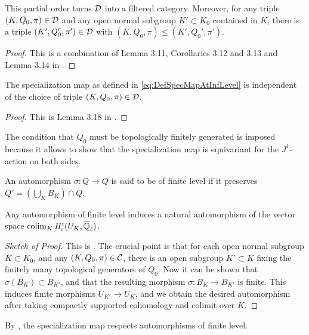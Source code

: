 \documentclass[../main.tex]{subfiles}
\begin{document}
\begin{lem}\label{lem:MiedaCategoryOfChoicesIsFiltered}
  This partial order turns $\mathcal{D}$ into a filtered category. Moreover, for any
  triple $(K, Q_0, \pi) \in \mathcal{D}$ and any open normal subgroup $K' \subset K_0$ 
  contained in $K$, there is a triple $(K', Q_0', \pi') \in \mathcal{D}$ with $(K, Q_0,
  \pi) \leq (K', Q_0', \pi')$. 
\begin{proof}
  This is a combination of Lemma 3.11, Corollaries 3.12 and 3.13 and 
  Lemma 3.14 in \cite{mieda2016geometric}.
\end{proof}
\end{lem}

\begin{prop}\label{lem:specmapisindependentofchoice}
  The specialization map as defined in \eqref{eq:DefSpecMapAtInfLevel} is
  independent of the choice of triple $(K, Q_0, \pi) \in \mathcal{D}$. 
  \begin{proof}
    This is Lemma 3.18 in \cite{mieda2016geometric}.
  \end{proof}
\end{prop}

The condition that $Q_0$ must be topologically finitely generated is imposed 
because it allows to show that the specialization map is equivariant for the 
$J^1$-action on both sides. 

\begin{defi}\label{def:MorphismOfFinLevel}
  An automorphism $\sigma\colon Q \to Q$ is said to be of finite level if it 
  preserves $Q' = (\bigcup_K B_K)\cap Q$. 
\end{defi}

\begin{lem}\label{lem:FinLevelAutoYIeldAutOfColim}
  Any automorphism of finite level
  induces a natural automorphism of the vector space $\operatorname*{colim}_K \mathit H_{\mathrm{c}}^i(U_K, {\overline {\mathbb{Q}}_\ell})$.
  \begin{proof}[Sketch of Proof] 
    This is \cite[Lemma 3.20]{mieda2016geometric}.  The crucial point 
    is that for each open normal subgroup $K \subset K_0$, and any 
    $(K, Q_0, \pi) \in \mathcal{C}$, there is an open subgroup $K' \subset K$ fixing the 
    finitely many topological generators of $Q_0$. Now it can be shown that 
    $\sigma(B_K) \subset B_{K'}$, and that the resulting morphism
    $\sigma\colon B_K \to B_{K'}$ is finite. This induces finite morphisms
    $U_{K'} \to U_K$, and we obtain the desired automorphism after taking 
    compactly supported cohomology and colimit over $K$. 
\end{proof}
\end{lem}
By \cite[Proposition 3.21]{mieda2016geometric}, the specialization map respects
automorphisms of finite level.
\end{document}
